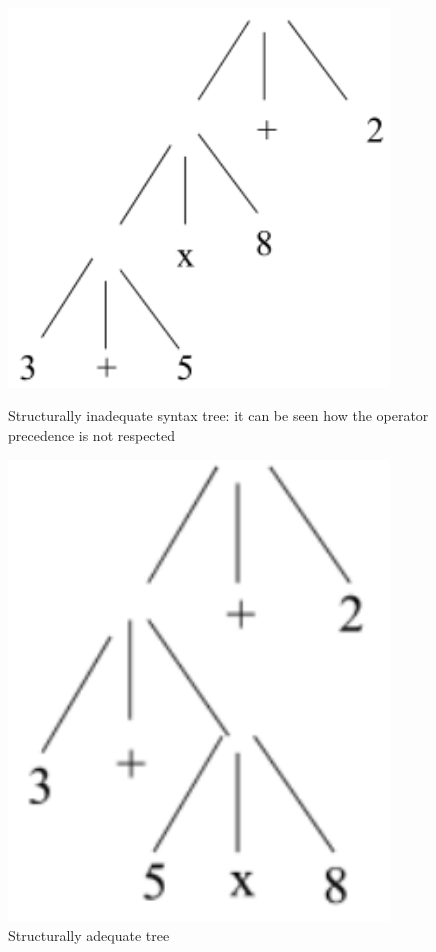 				\begin{figure}
					\centering
					\begin{minipage}{0.45\textwidth}
						\centering
						\includegraphics[width=0.9\textwidth]{./images/structAdeq1.png}
				    	\caption{Structurally inadequate syntax tree: it can be seen how the operator precedence is not respected}
					\end{minipage}\hfill
					\begin{minipage}{0.45\textwidth}
						\centering
						\includegraphics[width=0.9\textwidth]{./images/structAdeq2.png} 
				    	\caption{Structurally adequate tree}
					\end{minipage}
				\end{figure}
			
